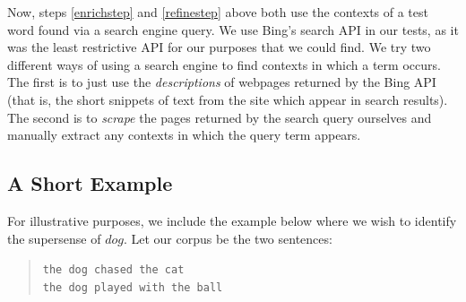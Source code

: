 \documentclass{article}
\begin{document}
Now, steps \ref{enrichstep} and \ref{refinestep} above both use the contexts of a test word found via a search engine query.
We use Bing's search API in our tests, as it was the least restrictive API for our purposes that we could find.
We try two different ways of using a search engine to find contexts in which a term occurs.
The first is to just use the {\it descriptions} of webpages returned by the Bing API (that is, the short snippets of text from the site which appear in search results).
The second is to {\it scrape} the pages returned by the search query ourselves and manually extract any contexts in which the query term appears.

\subsection{A Short Example}
For illustrative purposes, we include the example below where we wish to identify the supersense of $dog$. Let our corpus be the two sentences:
\begin{quote}
\texttt{the dog chased the cat\\ the dog played with the ball}
\end{quote}
\end{document}
